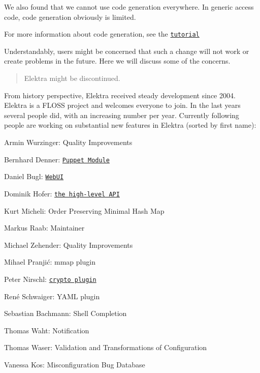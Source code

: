 We also found that we cannot use code generation everywhere. In generic access code, code generation obviously is limited.


\begin{DoxyItemize}
\item For more information about code generation, see the \href{https://www.libelektra.org/tools/gen}{\tt tutorial}
\end{DoxyItemize}

Understandably, users might be concerned that such a change will not work or create problems in the future. Here we will discuss some of the concerns.

\begin{quote}
Elektra might be discontinued. \end{quote}


From history perspective, Elektra received steady development since 2004. Elektra is a F\+L\+O\+SS project and welcomes everyone to join. In the last years several people did, with an increasing number per year. Currently following people are working on substantial new features in Elektra (sorted by first name)\+:


\begin{DoxyItemize}
\item Armin Wurzinger\+: Quality Improvements
\item Bernhard Denner\+: \href{https://github.com/ElektraInitiative/puppet-libelektra}{\tt Puppet Module}
\item Daniel Bugl\+: \href{https://www.libelektra.org/tools/web}{\tt Web\+UI}
\item Dominik Hofer\+: \href{https://www.libelektra.org/decisions/high-level-api}{\tt the high-\/level A\+PI}
\item Kurt Micheli\+: Order Preserving Minimal Hash Map
\item Markus Raab\+: Maintainer
\item Michael Zehender\+: Quality Improvements
\item Mihael Pranjić\+: mmap plugin
\item Peter Nirschl\+: \href{https://www.libelektra.org/plugins/crypto}{\tt crypto plugin}
\item René Schwaiger\+: Y\+A\+ML plugin
\item Sebastian Bachmann\+: Shell Completion
\item Thomas Waht\+: Notification
\item Thomas Waser\+: Validation and Transformations of Configuration
\item Vanessa Kos\+: Misconfiguration Bug Database
\end{DoxyItemize}

